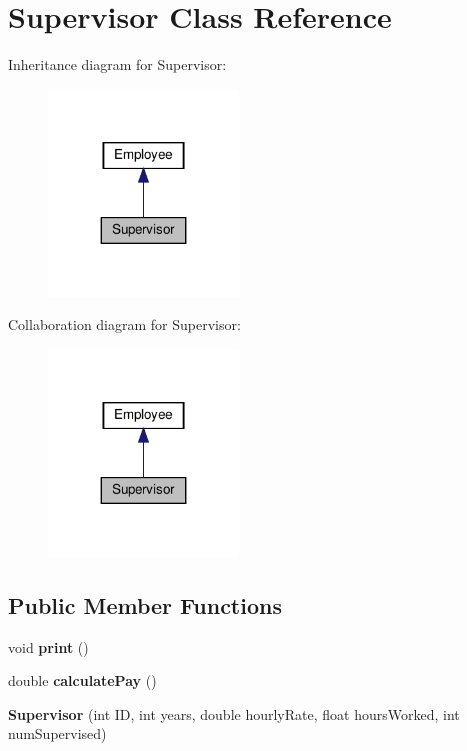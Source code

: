 \hypertarget{classSupervisor}{}\section{Supervisor Class Reference}
\label{classSupervisor}


Inheritance diagram for Supervisor\+:
\nopagebreak
\begin{figure}[H]
\begin{center}
\leavevmode
\includegraphics[width=143pt]{classSupervisor__inherit__graph}
\end{center}
\end{figure}


Collaboration diagram for Supervisor\+:
\nopagebreak
\begin{figure}[H]
\begin{center}
\leavevmode
\includegraphics[width=143pt]{classSupervisor__coll__graph}
\end{center}
\end{figure}
\subsection*{Public Member Functions}
\begin{DoxyCompactItemize}
\item 
\mbox{\label{classSupervisor_a92483dc9a54904d79b46c6ec4efb3f54}} 
void {\bfseries print} ()
\item 
\mbox{\label{classSupervisor_aa37daa89523c08b84ae8141299e036f8}} 
double {\bfseries calculate\+Pay} ()
\item 
\mbox{\label{classSupervisor_a02d9245744652deb20e9408001d6ed3b}} 
{\bfseries Supervisor} (int ID, int years, double hourly\+Rate, float hours\+Worked, int num\+Supervised)
\end{DoxyCompactItemize}

